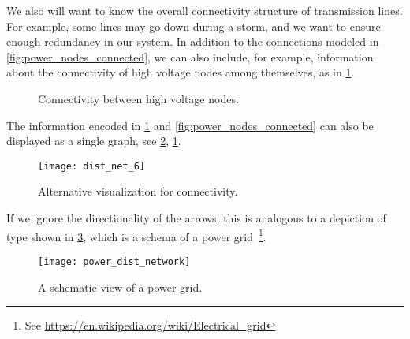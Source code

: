 We also will want to know the overall connectivity structure of transmission lines. For example, some lines may go down during a storm, and we want to ensure enough redundancy in our system. In addition to the connections modeled in \cref{fig:power_nodes_connected}, we can also include, for example, information about the connectivity of high voltage nodes among themselves, as in \cref{fig:power_internodal}.

\begin{figure}[h!]
    \centering
    \caption{Connectivity between high voltage nodes.}
    \label{fig:power_internodal}
\end{figure}
The information encoded in \cref{fig:power_internodal} and \cref{fig:power_nodes_connected} can also be displayed as a single graph, see \cref{fig:power_graph},
\cref{fig:power_internodal}.
\begin{figure}[h!]
    \centering
    \texttt{[image: dist\_net\_6]}
    \caption{Alternative visualization for connectivity.}
    \label{fig:power_graph}
\end{figure}
If we ignore the directionality of the arrows, this is analogous to a depiction of type shown in \cref{fig:power_schema}, which is a schema of a power grid~\cite{Cuffe17}\footnote{See \url{https://en.wikipedia.org/wiki/Electrical_grid}}.
\begin{figure}[h!]
    \centering
    \texttt{[image: power\_dist\_network]}
    \caption{A schematic view of a power grid.}
    \label{fig:power_schema}
\end{figure}
